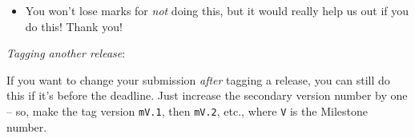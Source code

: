 \documentclass[
]{article}
\providecommand{\tightlist}{%
  \setlength{\itemsep}{0pt}\setlength{\parskip}{0pt}}
\begin{document}
\begin{itemize}
\tightlist
\item
  You won't lose marks for \emph{not} doing this, but it would really
  help us out if you do this! Thank you!
\end{itemize}

\emph{Tagging another release}:

If you want to change your submission \emph{after} tagging a release,
you can still do this if it's before the deadline. Just increase the
secondary version number by one -- so, make the tag version
\texttt{mV.1}, then \texttt{mV.2}, etc., where \texttt{V} is the
Milestone number.
\end{document}
